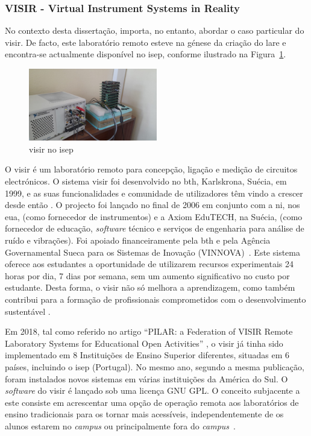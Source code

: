 \subsubsection{VISIR - Virtual Instrument Systems in Reality}
\label{sec:visir}
No contexto desta dissertação, importa, no entanto, abordar o caso particular do \acrshort{visir}. De facto, este laboratório remoto esteve na génese da criação do \acrshort{lare} e encontra-se actualmente disponível no \acrshort{isep}, conforme ilustrado na Figura~\ref{fig:visirISEP}.
\begin{figure}[hbtp]
    \centering
    \includegraphics[width=0.5\textwidth]{figures/visirISEP.jpeg}
    \caption{\acrshort{visir} no \acrshort{isep}}
    \label{fig:visirISEP}
\end{figure}

O \acrshort{visir} é um laboratório remoto para concepção, ligação e medição de circuitos electrónicos. O sistema \acrshort{visir} foi desenvolvido no \acrfull{bth}, Karlskrona, Suécia, em 1999, e as suas funcionalidades e comunidade de utilizadores têm vindo a crescer desde então \cite{RemoteLabsImpactVISIR}. O projecto foi lançado no final de 2006 em conjunto com a \acrfull{ni}, nos \acrshort{eua}, (como fornecedor de instrumentos) e a Axiom EduTECH, na Suécia, (como fornecedor de educação, \textit{software} técnico e serviços de engenharia para análise de ruído e vibrações). Foi apoiado financeiramente pela \acrshort{bth} e pela Agência Governamental Sueca para os Sistemas de Inovação (VINNOVA)~\cite{VISIRExperiencesChallenges}. Este sistema oferece aos estudantes a oportunidade de utilizarem recursos experimentais 24 horas por dia, 7 dias por semana, sem um aumento significativo no custo por estudante. Desta forma, o \acrshort{visir} não só melhora a aprendizagem, como também contribui para a formação de profissionais comprometidos com o desenvolvimento sustentável \cite{OpenLabs77:online}.

Em 2018, tal como referido no artigo ``PILAR: a Federation of VISIR Remote Laboratory Systems for Educational Open Activities'' \cite{PILARFederationVISIR}, o \acrshort{visir} já tinha sido implementado em 8 Instituições de Ensino Superior diferentes, situadas em 6 países, incluindo o \acrshort{isep} (Portugal). No mesmo ano, segundo a mesma publicação, foram instalados novos sistemas em várias instituições da América do Sul. O \textit{software} do \acrshort{visir} é lançado sob uma licença GNU GPL. O conceito subjacente a este consiste em acrescentar uma opção de operação remota aos laboratórios de ensino tradicionais para os tornar mais acessíveis, independentemente de os alunos estarem no \textit{campus} ou principalmente fora do \textit{campus}~\cite{TheVISIRproject}.


